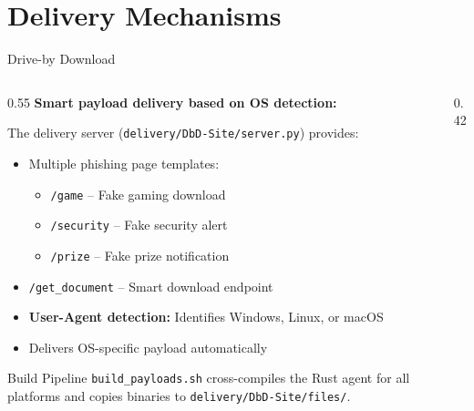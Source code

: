 \documentclass[aspectratio=169]{beamer}
\newcommand{\code}[1]{\texttt{\textcolor{primaryblue}{#1}}}
\begin{document}
\section{Delivery Mechanisms}

\begin{frame}[fragile]{Drive-by Download}
  \begin{columns}[T]
    \begin{column}{0.55\textwidth}
      \textbf{Smart payload delivery based on OS detection:}

      \vspace{0.5em}
      The delivery server (\code{delivery/DbD-Site/server.py}) provides:
      \begin{itemize}
        \item Multiple phishing page templates:
        \begin{itemize}
          \item \code{/game} -- Fake gaming download
          \item \code{/security} -- Fake security alert
          \item \code{/prize} -- Fake prize notification
        \end{itemize}
        \item \code{/get\_document} -- Smart download endpoint
        \item \textbf{User-Agent detection:} Identifies Windows, Linux, or macOS
        \item Delivers OS-specific payload automatically
      \end{itemize}

      \vspace{0.3em}
      \begin{infobox}{Build Pipeline}
        \code{build\_payloads.sh} cross-compiles the Rust agent for all platforms and copies binaries to \code{delivery/DbD-Site/files/}.
      \end{infobox}
    \end{column}
    \begin{column}{0.42\textwidth}
      \centering
\end{column}
\end{columns}
\end{frame}
\end{document}
